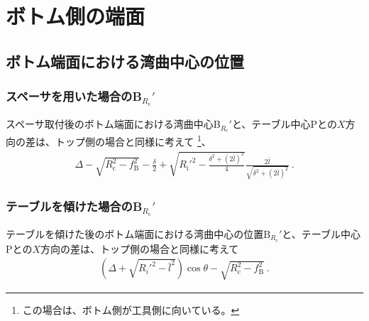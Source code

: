 \clearpage
\section{ボトム側の端面}



\subsection{ボトム端面における湾曲中心の位置}


\subsubsection{スペーサを用いた場合のB\texorpdfstring{$_{R_\mathrm c}'$}{Rc'}}
スペーサ取付後のボトム端面における湾曲中心B$_{R_\mathrm c}'$と、テーブル中心Pとの$X$方向の差は、トップ側の場合と同様に考えて
\footnote{この場合は、ボトム側が工具側に向いている。}、
\begin{align*}
  \varDelta-\sqrt{R_\mathrm c^2-f_\mathrm B^2}-\frac\delta2
  +\sqrt{R_\mathrm i'^2-\frac{\delta^2+(2\bar l)^2}4}\frac{2\bar l}{\sqrt{\delta^2+(2\bar l)^2}}\ .
\end{align*}


\subsubsection{テーブルを傾けた場合のB\texorpdfstring{$_{R_\mathrm c}'$}{Rc'}}
テーブルを傾けた後のボトム端面における湾曲中心の位置B$_{R_\mathrm c}'$と、テーブル中心Pとの$X$方向の差は、トップ側の場合と同様に考えて
\begin{align*}
  \left(\varDelta+\sqrt{R_i'^2-\bar l^2}\right)\cos\theta-\sqrt{R_\mathrm c^2-f_\mathrm B^2}~.
\end{align*}




